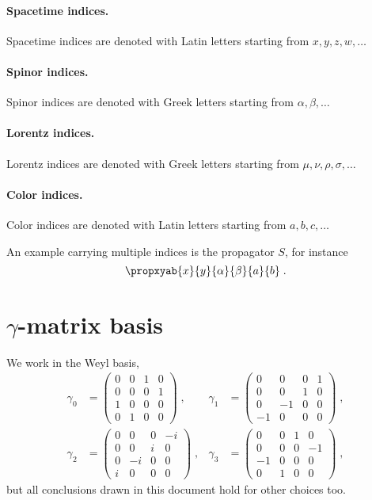 \paragraph{Spacetime indices.}
Spacetime indices are denoted with Latin letters starting from $x, y, z, w, \ldots$

\paragraph{Spinor indices.}
Spinor indices are denoted with Greek letters starting from $\alpha, \beta, \ldots$

\paragraph{Lorentz indices.}
Lorentz indices are denoted with Greek letters starting from $\mu, \nu, \rho, \sigma, \ldots$

\paragraph{Color indices.}
Color indices are denoted with Latin letters starting from $a, b, c, \ldots$

An example carrying multiple indices is the propagator $S$, for instance
\begin{equation}
\propxyab{x}{y}{\alpha}{\beta}{a}{b} \;.
\end{equation}


\section{$\gamma$-matrix basis}

We work in the Weyl basis,
\begin{align} \label{eq:gamma:weyl:basis}
\gamma_0 &=
\begin{pmatrix}
0 & 0 & 1 & 0 \\
0 & 0 & 0 & 1 \\
1 & 0 & 0 & 0 \\
0 & 1 & 0 & 0
\end{pmatrix} \;,
&
\gamma_1 &=
\begin{pmatrix}
0 & 0 & 0 & 1 \\
0 & 0 & 1 & 0 \\
0 & -1 & 0 & 0 \\
-1 & 0 & 0 & 0
\end{pmatrix} \;, \\
\gamma_2 &=
\begin{pmatrix}
0 & 0 & 0 & -i \\
0 & 0 & i & 0 \\
0 & -i & 0 & 0 \\
i & 0 & 0 & 0
\end{pmatrix} \;,
&
\gamma_3 &=
\begin{pmatrix}
0 & 0 & 1 & 0 \\
0 & 0 & 0 & -1 \\
-1 & 0 & 0 & 0 \\
0 & 1 & 0 & 0
\end{pmatrix} \;,
\end{align}
but all conclusions drawn in this document hold for other choices too.

